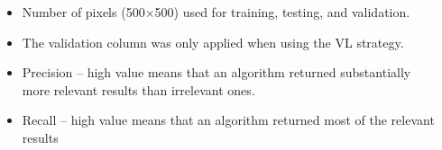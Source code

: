 \documentclass{beamer}
\begin{document}
\begin{frame}
\begin{columns}[T]
\begin{column}{.6\textwidth}
    \end{column}

    \begin{column}{.4\textwidth}
\vspace{3.0cm}

\begin{itemize}
\scriptsize
\item Number of pixels (500$\times$500) used for training, testing, and validation.
\item The validation column was only applied when using the VL strategy.
\item Precision --  high value means that an algorithm returned substantially more relevant results than irrelevant ones.
\item Recall -- high value means that an algorithm returned most of the relevant results
\end{itemize}


    \end{column}
  \end{columns}


\end{frame}

\end{document}
